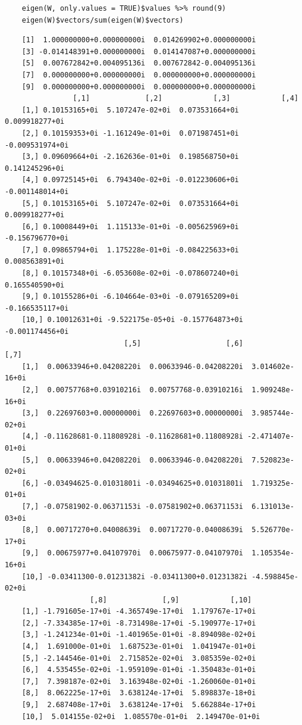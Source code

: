 \documentclass[11pt]{report}
\begin{document}
\begin{tcolorbox}
    \begin{verbatim}
    eigen(W, only.values = TRUE)$values %>% round(9)
    eigen(W)$vectors/sum(eigen(W)$vectors)
    \end{verbatim}
\tcblower
    \begin{verbatim}
    [1]  1.000000000+0.000000000i  0.014269902+0.000000000i
    [3] -0.014148391+0.000000000i  0.014147087+0.000000000i
    [5]  0.007672842+0.004095136i  0.007672842-0.004095136i
    [7]  0.000000000+0.000000000i  0.000000000+0.000000000i
    [9]  0.000000000+0.000000000i  0.000000000+0.000000000i
                [,1]             [,2]            [,3]            [,4]
    [1,] 0.10153165+0i  5.107247e-02+0i  0.073531664+0i  0.009918277+0i
    [2,] 0.10159353+0i -1.161249e-01+0i  0.071987451+0i -0.009531974+0i
    [3,] 0.09609664+0i -2.162636e-01+0i  0.198568750+0i  0.141245296+0i
    [4,] 0.09725145+0i  6.794340e-02+0i -0.012230606+0i -0.001148014+0i
    [5,] 0.10153165+0i  5.107247e-02+0i  0.073531664+0i  0.009918277+0i
    [6,] 0.10008449+0i  1.115133e-01+0i -0.005625969+0i -0.156796770+0i
    [7,] 0.09865794+0i  1.175228e-01+0i -0.084225633+0i  0.008563891+0i
    [8,] 0.10157348+0i -6.053608e-02+0i -0.078607240+0i  0.165540590+0i
    [9,] 0.10155286+0i -6.104664e-03+0i -0.079165209+0i -0.166535117+0i
    [10,] 0.10012631+0i -9.522175e-05+0i -0.157764873+0i -0.001174456+0i
                            [,5]                    [,6]             [,7]
    [1,]  0.00633946+0.04208220i  0.00633946-0.04208220i  3.014602e-16+0i
    [2,]  0.00757768+0.03910216i  0.00757768-0.03910216i  1.909248e-16+0i
    [3,]  0.22697603+0.00000000i  0.22697603+0.00000000i  3.985744e-02+0i
    [4,] -0.11628681-0.11808928i -0.11628681+0.11808928i -2.471407e-01+0i
    [5,]  0.00633946+0.04208220i  0.00633946-0.04208220i  7.520823e-02+0i
    [6,] -0.03494625-0.01031801i -0.03494625+0.01031801i  1.719325e-01+0i
    [7,] -0.07581902-0.06371153i -0.07581902+0.06371153i  6.131013e-03+0i
    [8,]  0.00717270+0.04008639i  0.00717270-0.04008639i  5.526770e-17+0i
    [9,]  0.00675977+0.04107970i  0.00675977-0.04107970i  1.105354e-16+0i
    [10,] -0.03411300-0.01231382i -0.03411300+0.01231382i -4.598845e-02+0i
                    [,8]             [,9]            [,10]
    [1,] -1.791605e-17+0i -4.365749e-17+0i  1.179767e-17+0i
    [2,] -7.334385e-17+0i -8.731498e-17+0i -5.190977e-17+0i
    [3,] -1.241234e-01+0i -1.401965e-01+0i -8.894098e-02+0i
    [4,]  1.691000e-01+0i  1.687523e-01+0i  1.041947e-01+0i
    [5,] -2.144546e-01+0i  2.715852e-02+0i  3.085359e-02+0i
    [6,]  4.535455e-02+0i -1.959109e-01+0i -1.350483e-01+0i
    [7,]  7.398187e-02+0i  3.163948e-02+0i -1.260060e-01+0i
    [8,]  8.062225e-17+0i  3.638124e-17+0i  5.898837e-18+0i
    [9,]  2.687408e-17+0i  3.638124e-17+0i  5.662884e-17+0i
    [10,]  5.014155e-02+0i  1.085570e-01+0i  2.149470e-01+0i
    \end{verbatim}
\end{tcolorbox}
\end{document}
